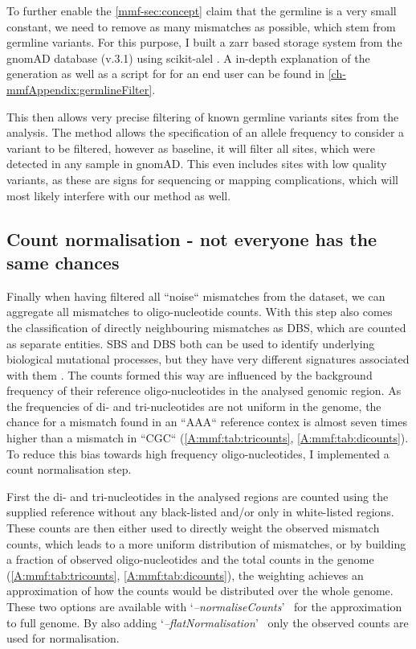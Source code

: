 To further enable the \autoref{mmf-sec:concept} claim that the germline is a very small constant, we need to remove as many mismatches as possible, which stem from germline variants. For this purpose, I built a zarr \cite{Miles2021} based storage system from the gnomAD database (v.3.1) \cite{Karczewski2020} using scikit-alel \cite{Miles2021a}.
A in-depth explanation of the generation as well as a script for for an end user can be found in \autoref{ch-mmfAppendix:germlineFilter}.

This then allows very precise filtering of known germline variants sites from the analysis. The method allows the specification of an allele frequency to consider a variant to be filtered, however as baseline, it will filter all sites, which were detected in any sample in gnomAD. This even includes sites with low quality variants, as these are signs for sequencing or mapping complications, which will most likely interfere with our method as well.


\subsection[Count normalisation]{Count normalisation - not everyone has the same chances}
\label{mmf-sec:countNorm}
Finally when having filtered all ``noise`` mismatches from the dataset, we can aggregate all mismatches to oligo-nucleotide counts. With this step also comes the classification of 
directly neighbouring mismatches as DBS, which are counted as separate entities. SBS and DBS both can be used to identify underlying biological mutational processes, but they have very different signatures associated with them \cite{Alexandrov2020}. The counts formed this way are influenced by the background frequency of their reference oligo-nucleotides in the analysed genomic region. As the frequencies of di- and tri-nucleotides are not uniform in the genome, the chance for a mismatch found in an ``AAA`` reference contex is almost seven times higher than a mismatch in ``CGC`` (\autoref{A:mmf:tab:tricounts}, \autoref{A:mmf:tab:dicounts}). To reduce this bias towards high frequency oligo-nucleotides, I implemented a count normalisation step.

First the di- and tri-nucleotides in the analysed regions are counted using the supplied reference without any black-listed and/or only in white-listed regions. These counts are then either used to directly weight the observed mismatch counts, which leads to a more uniform distribution of mismatches, or by building a fraction of observed oligo-nucleotides and the total counts in the genome (\autoref{A:mmf:tab:tricounts}, \autoref{A:mmf:tab:dicounts}), the weighting achieves an approximation of how the counts would be distributed over the whole genome. These two options are available with \lq\emph{--normaliseCounts}\rq~ for the approximation to full genome. By also adding \lq\emph{--flatNormalisation}\rq~ only the observed counts are used for normalisation.

